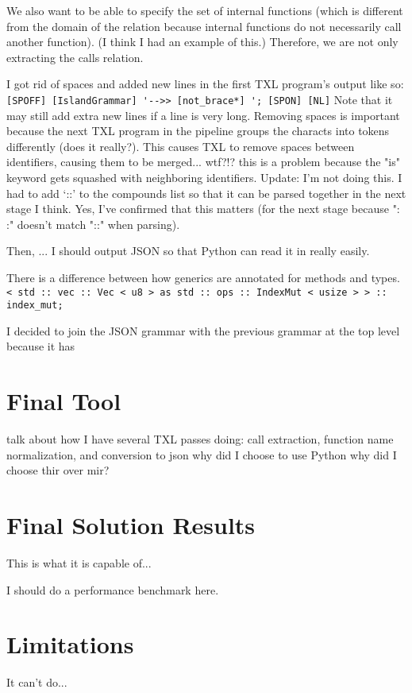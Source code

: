 \documentclass[11pt]{article}
\begin{document}
We also want to be able to specify the set of internal functions (which is different from the domain of the relation because internal functions do not necessarily call another function).
(I think I had an example of this.)
Therefore, we are not only extracting the calls relation.

I got rid of spaces and added new lines in the first TXL program's output like so:
\lstinline{[SPOFF] [IslandGrammar] '-->> [not_brace*] '; [SPON] [NL]}
Note that it may still add extra new lines if a line is very long.
Removing spaces is important because the next TXL program in the pipeline groups the characts into tokens differently (does it really?).
This causes TXL to remove spaces between identifiers, causing them to be merged... wtf?!?
    this is a problem because the "is" keyword gets squashed with neighboring identifiers.
Update:
I'm not doing this.
I had to add `::' to the compounds list so that it can be parsed together in the next stage I think.
    Yes, I've confirmed that this matters (for the next stage because ": :" doesn't match "::" when parsing).

Then, ... I should output JSON so that Python can read it in really easily.

There is a difference between how generics are annotated for methods and types.
\lstinline{< std :: vec :: Vec < u8 > as std :: ops :: IndexMut < usize > > :: index_mut;}

I decided to join the JSON grammar with the previous grammar at the top level because it has 

\section{Final Tool} %
talk about how I have several TXL passes doing: call extraction, function name normalization, and conversion to json
why did I choose to use Python
why did I choose thir over mir?

\section{Final Solution Results}
This is what it is capable of...

I should do a performance benchmark here.

\section{Limitations}
It can't do...
\end{document}

